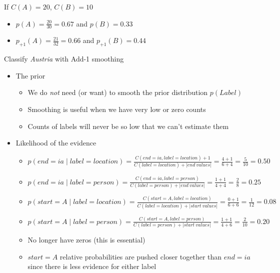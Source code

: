 \documentclass[11pt,letterpaper]{article}
\begin{document}
\begin{itemize}
\begin{itemize}
        If $C(A)=20$, $C(B)=10$
        \begin{itemize}
          \item $p(A)=\frac{20}{30} = \mathbf{0.67}$ and 
                $p(B) = \mathbf{0.33}$
          \item $p_{+1}(A)=\frac{21}{32} = \mathbf{0.66}$ and 
                $p_{+1}(B) = \mathbf{0.44}$
        \end{itemize}
    \end{itemize}
\end{itemize}


Classify \textit{Austria} with Add-1 smoothing

\begin{itemize}
  \item The prior
    \begin{itemize}
      \item We do \textit{not} need (or want) to smooth the prior distribution $p(Label)$
      \item Smoothing is useful when we have very low or zero counts
      \item Counts of labels will never be so low that we can't estimate them
    \end{itemize}

  \item Likelihood of the evidence
    \begin{itemize}
      \item $p(end=ia \mid label=location) = \frac{C(end=ia, label=location)+1}{C(label=location)+|end~values|} = \frac{4+1}{6+4} = \frac{5}{10} = 0.50$
      \item $p(end=ia \mid label=person) = \frac{C(end=ia, label=person)}{C(label=person)+|end~values|} = \frac{1+1}{4+4} = \frac{2}{8} = 0.25$
      \\
      \item $p(start=A \mid label=location) = \frac{C(start=A, label=location)}{C(label=location)+|start~values|} = \frac{0+1}{6+6} = \frac{1}{12} = 0.08$
      \item $p(start=A \mid label=person) = \frac{C(start=A, label=person)}{C(label=person)+|start~values|} = \frac{1+1}{4+6} = \frac{2}{10} = 0.20$
      \\
      \item No longer have zeros (this is essential)
      \item $start=A$ relative probabilities are pushed closer together than $end=ia$ since there is less evidence for either label


\end{itemize}
\end{itemize}
\end{document}
